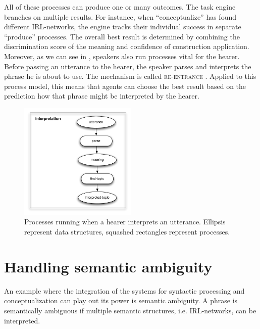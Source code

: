 All of these processes can produce one or many outcomes. The task engine
branches on multiple results. For instance, when ``conceptualize'' has found
different IRL-networks, the engine tracks their individual success in separate 
``produce'' processes. The overall best result is determined by 
combining the discrimination score of the meaning and confidence of construction 
application. Moreover, as we can see in , speakers also run processes vital 
for the hearer. Before passing an utterance to the hearer, the speaker parses and
interprets the phrase he is about to use. The mechanism is called 
\textsc{re-entrance} \citep{steels03reentrance}. Applied to this process model,
this means that agents can choose the best result based on the 
prediction how that phrase might be interpreted by the hearer.

\begin{figure}
\begin{center}
\includegraphics[width=0.5\textwidth]{figs/interpretation}
\caption[Processes running when a hearer interprets an utterance]{%
Processes running when a hearer interprets an utterance. Ellipsis represent
data structures, squashed rectangles represent processes.}
\label{f:interpretation}
\end{center}
\end{figure}

\section{Handling semantic ambiguity}
\label{s:semantic-ambiguity}
An example where the integration of the systems for syntactic processing
and conceptualization can play out its power is semantic ambiguity.
A phrase is semantically ambiguous if multiple semantic structures, i.e. IRL-networks,
can be interpreted. 


